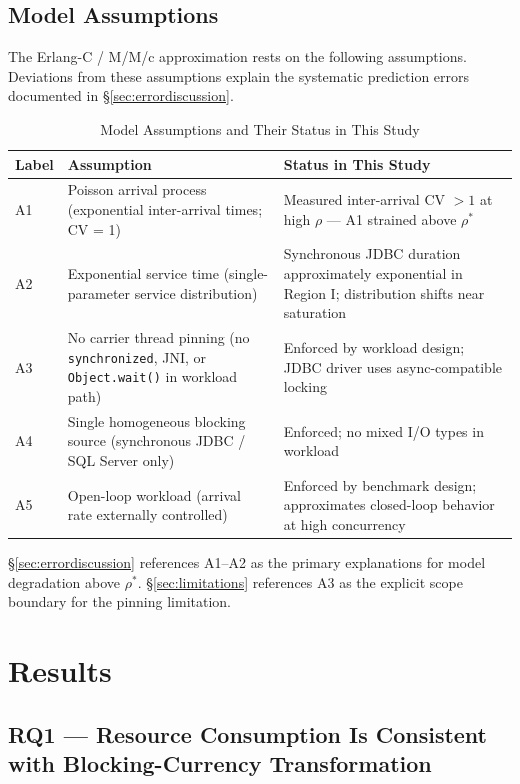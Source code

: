 \documentclass[10pt]{article}
\begin{document}
\subsection{Model Assumptions}
\label{sec:assumptions}

The Erlang-C / M/M/c approximation rests on the following assumptions. Deviations from these assumptions explain the systematic prediction errors documented in \S\ref{sec:errordiscussion}.

\begin{table}[t]
\centering
\caption{Model Assumptions and Their Status in This Study}
\label{tab:assumptions}
\begin{tabular}{@{}p{1.2cm}p{7.5cm}p{8.5cm}@{}}
\toprule
\textbf{Label} & \textbf{Assumption} & \textbf{Status in This Study} \\
\midrule
A1 & Poisson arrival process (exponential inter-arrival times; CV = 1) & Measured inter-arrival CV $> 1$ at high $\rho$ --- A1 strained above $\rho^*$ \\
A2 & Exponential service time (single-parameter service distribution) & Synchronous JDBC duration approximately exponential in Region I; distribution shifts near saturation \\
A3 & No carrier thread pinning (no \texttt{synchronized}, JNI, or \texttt{Object.wait()} in workload path) & Enforced by workload design; JDBC driver uses async-compatible locking \\
A4 & Single homogeneous blocking source (synchronous JDBC / SQL Server only) & Enforced; no mixed I/O types in workload \\
A5 & Open-loop workload (arrival rate externally controlled) & Enforced by benchmark design; approximates closed-loop behavior at high concurrency \\
\bottomrule
\end{tabular}
\end{table}

\S\ref{sec:errordiscussion} references A1--A2 as the primary explanations for model degradation above $\rho^*$. \S\ref{sec:limitations} references A3 as the explicit scope boundary for the pinning limitation.

\section{Results}
\label{sec:results}

\subsection{RQ1 --- Resource Consumption Is Consistent with Blocking-Currency Transformation}
\end{document}
